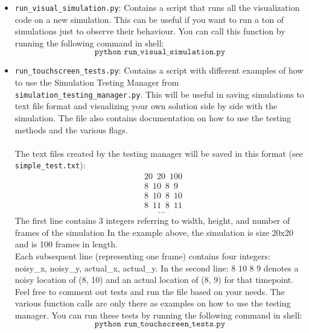 \documentclass{article}
\begin{document}
\begin{itemize}
        \item \texttt{run\_visual\_simulation.py}: Contains a script that runs all the visualization code on a new simulation. This can be useful if you want to run a ton of simulations just to observe their behaviour. You can call this function by running the following command in shell:
        $$\texttt{python run\_visual\_simulation.py}$$
        \item \texttt{run\_touchscreen\_tests.py}: Contains a script with different examples of how to use the Simulation Testing Manager from \texttt{simulation\_testing\_manager.py}. This will be useful in saving simulations to text file format and visualizing your own solution side by side with the simulation. The file also contains documentation on how to use the testing methods and the various flags.
        \\\\
        The text files created by the testing manager will be saved in this format (see \texttt{simple\_test.txt}):
        \begin{align*}
        &20\,\,\,20\,\,\,100 \\
        &8\,\,\,10\,\,\,8\,\,\,9\\
        &8\,\,\,10\,\,\,8\,\,\,10\\
        &8\,\,\,11\,\,\,8\,\,\,11\\
        &\,\,\,\,\,\,\,\,\,\,...
        \end{align*}
        The first line contains 3 integers referring to width, height, and number of frames of the simulation In the example above, the simulation is size 20x20 and is 100 frames in length.\\
        Each subsequent line (representing one frame) contains four integers: noisy\_x, noisy\_y, actual\_x, actual\_y. In the second line: $8\,\,10\,\,8\,\,9$ denotes a noisy location of (8, 10) and an actual location of (8, 9) for that timepoint.\\
        
        Feel free to comment out tests and run the file based on your needs. The various function calls are only there as examples on how to use the testing manager. You can run these tests by running the following command in shell:
        $$\texttt{python run\_touchscreen\_tests.py}$$
        

\end{itemize}
\end{document}
